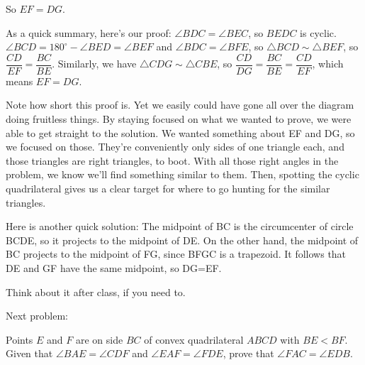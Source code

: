 
So $EF = DG$.


% 

As a quick summary, here's our proof: $\angle BDC = \angle BEC$, so $BEDC$ is cyclic. $\angle BCD = 180^\circ - \angle BED = \angle BEF$ and $\angle BDC = \angle BFE$, so $\triangle BCD \sim \triangle BEF$, so $\dfrac{CD}{EF} = \dfrac{BC}{BE}$. Similarly, we have $\triangle CDG \sim \triangle CBE$, so $\dfrac{CD}{DG}  = \dfrac{BC}{BE} = \dfrac{CD}{EF}$, which means $EF = DG.$

% 

% 



Note how short this proof is. Yet we easily could have gone all over the diagram doing fruitless things. By staying focused on what we wanted to prove, we were able to get straight to the solution. We wanted something about EF and DG, so we focused on those. They're conveniently only sides of one triangle each, and those triangles are right triangles, to boot. With all those right angles in the problem, we know we'll find something similar to them. Then, spotting the cyclic quadrilateral gives us a clear target for where to go hunting for the similar triangles.

Here is another quick solution: The midpoint of BC is the circumcenter of circle BCDE, so it projects to the midpoint of DE. On the other hand, the midpoint of BC projects to the midpoint of FG, since BFGC is a trapezoid. It follows that DE and GF have the same midpoint, so DG=EF.

Think about it after class, if you need to. 

Next problem:

Points $E$ and $F$ are on side $BC$ of convex quadrilateral $ABCD$ with $BE < BF.$ Given that $\angle BAE = \angle CDF$ and $\angle EAF = \angle FDE$, prove that $\angle FAC = \angle EDB$.

